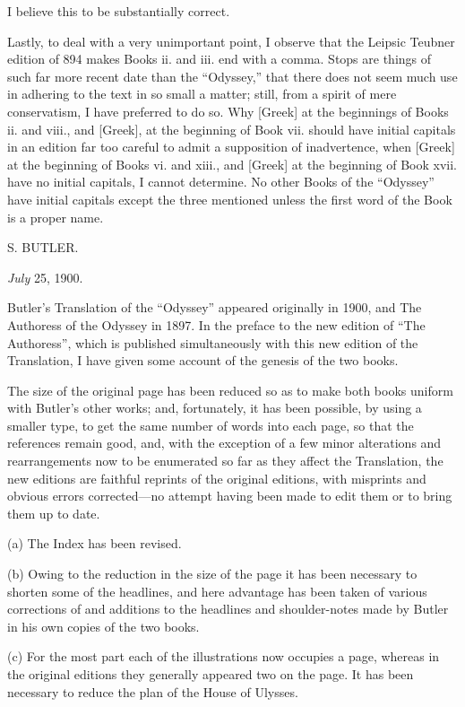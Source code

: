 I believe this to be substantially correct.

Lastly, to deal with a very unimportant point, I observe that the Leipsic
Teubner edition of 894 makes Books ii. and iii. end with a comma. Stops are
things of such far more recent date than the “Odyssey,” that there does not
seem much use in adhering to the text in so small a matter; still, from a
spirit of mere conservatism, I have preferred to do so. Why [Greek] at the
beginnings of Books ii. and viii., and [Greek], at the beginning of Book vii.
should have initial capitals in an edition far too careful to admit a
supposition of inadvertence, when [Greek] at the beginning of Books vi. and
xiii., and [Greek] at the beginning of Book xvii. have no initial capitals, I
cannot determine. No other Books of the “Odyssey” have initial capitals except
the three mentioned unless the first word of the Book is a proper name.

S. BUTLER.

\emph{July} 25, 1900.


Butler’s Translation of the “Odyssey” appeared originally in 1900, and The
Authoress of the Odyssey in 1897. In the preface to the new edition of “The
Authoress”, which is published simultaneously with this new edition of the
Translation, I have given some account of the genesis of the two books.

The size of the original page has been reduced so as to make both books uniform
with Butler’s other works; and, fortunately, it has been possible, by using a
smaller type, to get the same number of words into each page, so that the
references remain good, and, with the exception of a few minor alterations and
rearrangements now to be enumerated so far as they affect the Translation, the
new editions are faithful reprints of the original editions, with misprints and
obvious errors corrected—no attempt having been made to edit them or to bring
them up to date.

(a) The Index has been revised.

(b) Owing to the reduction in the size of the page it has been necessary to
shorten some of the headlines, and here advantage has been taken of various
corrections of and additions to the headlines and shoulder-notes made by Butler
in his own copies of the two books.

(c) For the most part each of the illustrations now occupies a page, whereas in
the original editions they generally appeared two on the page. It has been
necessary to reduce the plan of the House of Ulysses.

